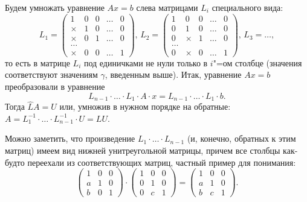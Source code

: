 Будем умножать уравнение $Ax=b$ слева матрицами $L_i$ специального вида:
\[
	L_1 = \left(
	\begin{array}{ccccc}
			1      & 0 & 0 & \ldots & 0 \\
			\times & 1 & 0 & \ldots & 0 \\
			\times & 0 & 1 & \ldots & 0 \\
			\ldots &                    \\
			\times & 0 & 0 & \ldots & 1
		\end{array}
	\right),\,
	L_2 = \left(
	\begin{array}{ccccc}
			1      & 0      & 0 & \ldots & 0 \\
			0      & 1      & 0 & \ldots & 0 \\
			0      & \times & 1 & \ldots & 0 \\
			\ldots &                         \\
			0      & \times & 0 & \ldots & 1
		\end{array}
	\right),\,
	L_3 = \ldots,
\]
то есть в матрице $L_i$ под единичками не нули только в $i$"=ом столбце (значения соответствуют
значениям $\gamma$, введенным выше). Итак,
уравнение $Ax=b$ преобразовали в уравнение
\[L_{n-1}\cdot\ldots\cdot L_1\cdot A\cdot x = L_{n-1}\cdot\ldots\cdot L_1\cdot b.\]
Тогда $\hat{L}A=U$ или, умножив в нужном порядке
на обратные: $A = L_{1}^{-1}\cdot\ldots\cdot L^{-1}_{n-1}\cdot U=LU$.
\begin{remark}
	Можно заметить, что произведение $L_{1}\cdot\ldots\cdot L_{n-1}$ (и, конечно, обратных к этим матриц)
	имеем вид
	нижней унитреугольной матрицы, причем все столбцы как-будто переехали из соответствующих матриц,
	частный пример для понимания:
	\[
		\left(
		\begin{array}{ccc}
				1 & 0 & 0 \\
				a & 1 & 0 \\
				b & 0 & 1
			\end{array}
		\right)\cdot
		\left(
		\begin{array}{ccc}
				1 & 0 & 0 \\
				0 & 1 & 0 \\
				0 & c & 1
			\end{array}
		\right)=
		\left(
		\begin{array}{ccc}
				1 & 0 & 0 \\
				a & 1 & 0 \\
				b & c & 1
			\end{array}
		\right).
	\]
\end{remark}

